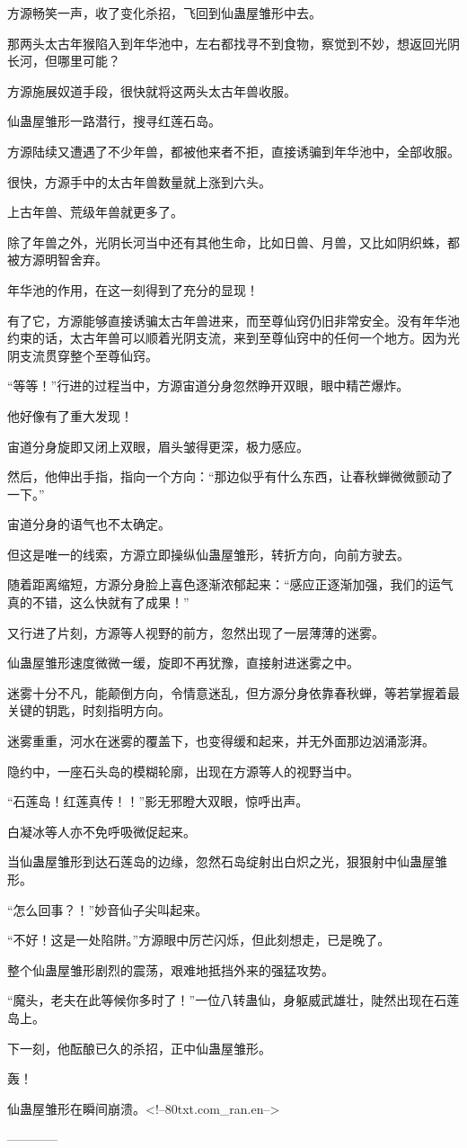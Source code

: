 \begin{this_body}
方源畅笑一声，收了变化杀招，飞回到仙蛊屋雏形中去。

那两头太古年猴陷入到年华池中，左右都找寻不到食物，察觉到不妙，想返回光阴长河，但哪里可能？

方源施展奴道手段，很快就将这两头太古年兽收服。

仙蛊屋雏形一路潜行，搜寻红莲石岛。

方源陆续又遭遇了不少年兽，都被他来者不拒，直接诱骗到年华池中，全部收服。

很快，方源手中的太古年兽数量就上涨到六头。

上古年兽、荒级年兽就更多了。

除了年兽之外，光阴长河当中还有其他生命，比如日兽、月兽，又比如阴织蛛，都被方源明智舍弃。

年华池的作用，在这一刻得到了充分的显现！

有了它，方源能够直接诱骗太古年兽进来，而至尊仙窍仍旧非常安全。没有年华池约束的话，太古年兽可以顺着光阴支流，来到至尊仙窍中的任何一个地方。因为光阴支流贯穿整个至尊仙窍。

“等等！”行进的过程当中，方源宙道分身忽然睁开双眼，眼中精芒爆炸。

他好像有了重大发现！

宙道分身旋即又闭上双眼，眉头皱得更深，极力感应。

然后，他伸出手指，指向一个方向：“那边似乎有什么东西，让春秋蝉微微颤动了一下。”

宙道分身的语气也不太确定。

但这是唯一的线索，方源立即操纵仙蛊屋雏形，转折方向，向前方驶去。

随着距离缩短，方源分身脸上喜色逐渐浓郁起来：“感应正逐渐加强，我们的运气真的不错，这么快就有了成果！”

又行进了片刻，方源等人视野的前方，忽然出现了一层薄薄的迷雾。

仙蛊屋雏形速度微微一缓，旋即不再犹豫，直接射进迷雾之中。

迷雾十分不凡，能颠倒方向，令情意迷乱，但方源分身依靠春秋蝉，等若掌握着最关键的钥匙，时刻指明方向。

迷雾重重，河水在迷雾的覆盖下，也变得缓和起来，并无外面那边汹涌澎湃。

隐约中，一座石头岛的模糊轮廓，出现在方源等人的视野当中。

“石莲岛！红莲真传！！”影无邪瞪大双眼，惊呼出声。

白凝冰等人亦不免呼吸微促起来。

当仙蛊屋雏形到达石莲岛的边缘，忽然石岛绽射出白炽之光，狠狠射中仙蛊屋雏形。

“怎么回事？！”妙音仙子尖叫起来。

“不好！这是一处陷阱。”方源眼中厉芒闪烁，但此刻想走，已是晚了。

整个仙蛊屋雏形剧烈的震荡，艰难地抵挡外来的强猛攻势。

“魔头，老夫在此等候你多时了！”一位八转蛊仙，身躯威武雄壮，陡然出现在石莲岛上。

下一刻，他酝酿已久的杀招，正中仙蛊屋雏形。

轰！

仙蛊屋雏形在瞬间崩溃。<!--80txt.com\_ran.en-->

------------

\end{this_body}

